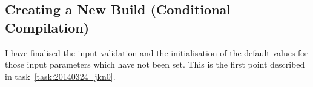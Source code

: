 \subsection{Creating a New Build (Conditional Compilation)}
\label{task:20140402_jkn0}
I have finalised the input validation and the initialisation of the default values for those input parameters which have not been set. This is the first point described in task~\ref{task:20140324_jkn0}.
